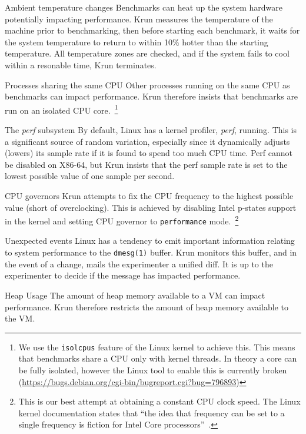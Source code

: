 \documentclass[10pt,preprint]{sigplanconf}
\begin{document}
\begin{description*}
\item[Ambient temperature changes] Benchmarks can heat up the system hardware
potentially impacting performance. Krun measures the temperature of the machine
prior to benchmarking, then before starting each benchmark, it waits for the
system temperature to return to within 10$\%$ hotter than the starting
temperature. All temperature zones are checked, and if the system fails to cool
within a resonable time, Krun terminates.
\item[Processes sharing the same CPU] Other processes running on the same CPU
as benchmarks can impact performance. Krun therefore insists that benchmarks
are run on an isolated CPU core.~\footnote{We use the \texttt{isolcpus} feature
of the Linux kernel to achieve this. This means that benchmarks share a CPU
only with kernel threads. In theory a core can be fully isolated, however the
Linux tool to enable this is currently broken
(\url{https://bugs.debian.org/cgi-bin/bugreport.cgi?bug=796893})}
\item[The \emph{perf} subsystem] By default, Linux has a kernel profiler,
\emph{perf}, running. This is a significant source of random variation,
especially since it dynamically adjusts (lowers) its sample rate if it is found
to spend too much CPU time. Perf cannot be disabled on X86-64, but Krun insists
that the perf sample rate is set to the lowest possible value of one sample per
second.
\item[CPU governors] Krun attempts to fix the CPU frequency to the highest
possible value (short of overclocking). This is achieved by disabling Intel
p-states support in the kernel and setting CPU governor to \texttt{performance}
mode.~\footnote{This is our best attempt at obtaining a constant CPU clock
speed. The Linux kernel documentation states that ``the idea that frequency can
be set to a single frequency is fiction for Intel Core
processors''~\cite{XXX}.}
\item[Unexpected events] Linux has a tendency to emit important information
relating to system performance to the \texttt{dmesg(1)} buffer. Krun monitors
this buffer, and in the event of a change, mails the experimenter a unified
diff. It is up to the experimenter to decide if the message has impacted
performance.
\item[Heap Usage] The amount of heap memory available to a VM can impact
performance. Krun therefore restricts the amount of heap memory available to
the VM.
\end{description*}
\end{document}
